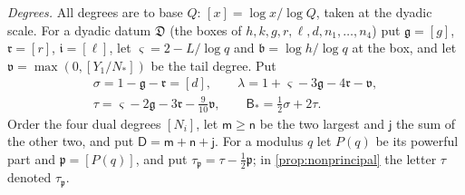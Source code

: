 \documentclass[11pt,colorlinks]{charlie}
\begin{document}
\emph{Degrees.} All degrees are to base $Q$: $[x]=\log x/\log Q$, taken at the dyadic scale. For a dyadic datum $\mathfrak D$ (the boxes of $h,k,g,r,\ell,d,n_1,\dots,n_4$) put $\mathfrak g=[g]$, $\mathfrak r=[r]$, $\mathfrak i=[\ell]$, let $\varsigma=2-L/\log q$ and $\mathfrak b=\log h/\log q$ at the box, and let $\mathfrak v=\max(0,[Y_1/N_*])$ be the tail degree. Put
\begin{gather*}
 \sigma=1-\mathfrak g-\mathfrak r=[d],\qquad
 \lambda=1+\varsigma-3\mathfrak g-4\mathfrak r-\mathfrak v,\\
 \tau=\varsigma-2\mathfrak g-3\mathfrak r-\tfrac9{10}\mathfrak v,\qquad\mathsf B_*=\tfrac12\sigma+2\tau .
\end{gather*}
Order the four dual degrees $[N_i]$, let $\mathsf m\ge\mathsf n$ be the two largest and $\mathsf j$ the sum of the other two, and put $\mathsf D=\mathsf m+\mathsf n+\mathsf j$. For a modulus $q$ let $P(q)$ be its powerful part and $\mathfrak p=[P(q)]$, and put $\tau_{\mathfrak p}=\tau-\frac12\mathfrak p$; in \cref{prop:nonprincipal} the letter $\tau$ denoted $\tau_{\mathfrak p}$.
\end{document}
